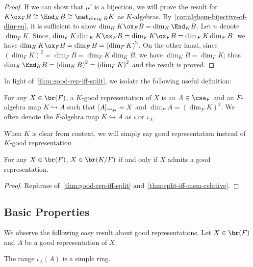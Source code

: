 \begin{proof}
   If we can show that $\mu'$ is a bijection, we will prove the result for $K\ox_{F} B \cong \End_{K} B \cong \mat_{\dim_{K} B}K$ as $K$-algebras. By~\cref{cor:alghom-bijective-of-dim-eq}, it is sufficient to show $\dim_{K}K\ox_{F}B = \dim_{K}\End_{K}B$. Let $n$ denote $\dim_{F}K$. Since, $\dim_{F}K\dim_{K}K\ox_{F}B =\dim_{F}K\ox_{F}B=\dim_{F}K \dim_{F}B$. we have $\dim_{K}K\ox_{F}B = \dim_{F}B = {\left(\dim_{F}K\right)}^{2}$. On the other hand, since ${\left(\dim_{F}K\right)}^{2}=\dim_{F} B = \dim_{F}K\dim_{K}B$, we have $\dim_{K} B = \dim_{F}K$; thus $\dim_{K}\End_{K} B = {\left(\dim_{K}B\right)}^{2}={\left(\dim_{F}K\right)}^{2}$ and the result is proved.
 \end{proof}

 In light of~\cref{thm:good-rep-iff-split}, we isolate the following useful definition:
 \begin{definition}\label{def:good-rep}
   For any $X \in \br(F)$, a $K$-good representation of $X$ is an $A \in \csa_{F}$ and an $F$-algebra map $K \hookrightarrow A$ such that $[A]_{\sim_{\br}} = X$ and $\dim_{F}A={\left(\dim_{F}K\right)}^{2}$. We often denote the $F$-algebra map $K \hookrightarrow A$ as $\iota$ or $\iota_{A}$.

   \leanok
 \end{definition}

 When $K$ is clear from context, we will simply say good representation instead of $K$-good representation

 \begin{corollary}
   \label{cor:mem-relative-br-iff-good-rep}
   For any $X\in\br(F)$, $X\in\br(K/F)$ if and only if $X$ admits a good representation.
   \leanok
 \end{corollary}
 \begin{proof}
   Rephrase of~\cref{thm:good-rep-iff-split} and~\cref{thm:split-iff-mem-relative}.
 \end{proof}

\subsection{Basic Properties}
We observe the following easy result about good representations. Let $X \in \br(F)$ and $A$ be a good representation of $X$.

\begin{lemma}
  The range $\iota_{A}(A)$ is a simple ring.
  \leanok
\end{lemma}


